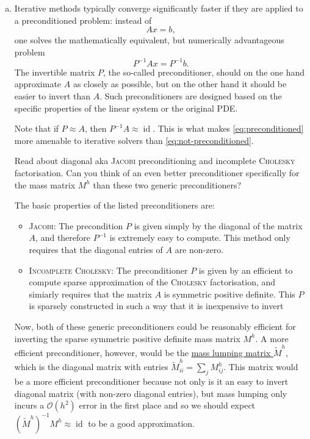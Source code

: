 \begin{enumerate}[(a)]
\item Iterative methods typically converge significantly faster if they are applied to a preconditioned problem: instead of
\begin{equation}\label{eq:not-preconditioned}
Ax=b,
\end{equation}
one solves the mathematically equivalent, but numerically advantageous problem
\begin{equation}\label{eq:preconditioned}
P^{-1}Ax = P^{-1} b.
\end{equation}
The invertible matrix $P$, the so-called preconditioner, should on the one hand approximate $A$ as closely as possible, but on the other hand it should be easier to invert than $A$. Such preconditioners are designed based on the specific properties of the linear system or the original PDE.

Note that if $P \approx A$, then $P^{-1}A \approx \operatorname{id}$. This is what makes \eqref{eq:preconditioned} more amenable to iterative solvers than \eqref{eq:not-preconditioned}. 

Read about diagonal aka \textsc{Jacobi} preconditioning and incomplete \textsc{Cholesky} factorisation. Can you think of an even better preconditioner specifically for the mass matrix $M^h$ than these two generic preconditioners?

\vspace{0.25cm}
\begin{solution}
The basic properties of the listed preconditioners are:
\begin{itemize}
\item \textsc{Jacobi:} The precondition $P$ is given simply by the diagonal of the matrix $A$, and therefore $P^{-1}$ is extremely easy to compute. This method only requires that the diagonal entries of $A$ are non-zero.
\item \textsc{Incomplete Cholesky:} The preconditioner $P$ is given by an efficient to compute sparse approximation of the \textsc{Cholesky} factorisation, and simiarly requires that the matrix $A$ is symmetric positive definite. This $P$ is sparsely constructed in such a way that it is inexpensive to invert
\end{itemize}

Now, both of these generic preconditioners could be reasonably efficient for inverting the sparse symmetric positive definite mass matrix $M^h$. A more efficient preconditioner, however, would be the \underline{mass lumping matrix $\tilde{M}^h$}, which is the diagonal matrix with entries $\tilde{M}^h_{ii} = \sum_j M^h_{ij}$.
This matrix would be a more efficient preconditioner because not only is it an easy to invert diagonal matrix (with non-zero diagonal entries), but mass lumping only incurs a $\mathcal{O}(h^2)$ error in the first place and so we should expect $(\tilde{M}^h)^{-1}M^h \approx \operatorname{id}$ to be a good approximation.


\end{solution}

\end{enumerate}

